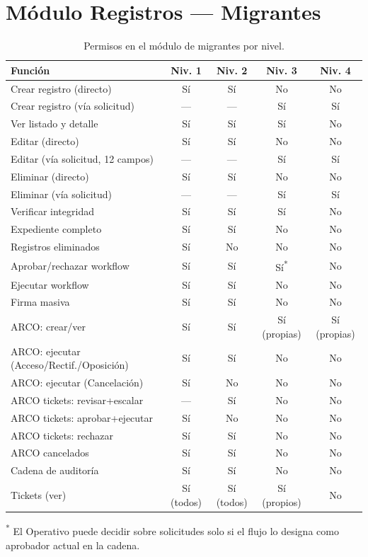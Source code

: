 \documentclass[10pt,letterpaper]{report}
\begin{document}
\section{Módulo Registros — Migrantes}

\begin{table}[H]\centering
\caption{Permisos en el módulo de migrantes por nivel.}
\label{tab:permisos_migrantes}
\begin{tabularx}{\textwidth}{X c c c c}
\toprule
\textbf{Función} & \textbf{Niv. 1} & \textbf{Niv. 2} & \textbf{Niv. 3} & \textbf{Niv. 4}\\
\midrule
Crear registro (directo)               & Sí & Sí & No & No\\
Crear registro (vía solicitud)         & --- & --- & Sí & Sí\\
Ver listado y detalle                  & Sí & Sí & Sí & No\\
Editar (directo)                       & Sí & Sí & No & No\\
Editar (vía solicitud, 12 campos)      & --- & --- & Sí & Sí\\
Eliminar (directo)                     & Sí & Sí & No & No\\
Eliminar (vía solicitud)               & --- & --- & Sí & Sí\\
Verificar integridad                   & Sí & Sí & Sí & No\\
Expediente completo                    & Sí & Sí & No & No\\
Registros eliminados                   & Sí & No & No & No\\
Aprobar/rechazar workflow              & Sí & Sí & Sí\textsuperscript{*} & No\\
Ejecutar workflow                      & Sí & Sí & No & No\\
Firma masiva                           & Sí & Sí & No & No\\
ARCO: crear/ver                        & Sí & Sí & Sí (propias) & Sí (propias)\\
ARCO: ejecutar (Acceso/Rectif./Oposición) & Sí & Sí & No & No\\
ARCO: ejecutar (Cancelación)           & Sí & No & No & No\\
ARCO tickets: revisar+escalar          & --- & Sí & No & No\\
ARCO tickets: aprobar+ejecutar         & Sí & No & No & No\\
ARCO tickets: rechazar                 & Sí & Sí & No & No\\
ARCO cancelados                        & Sí & Sí & No & No\\
Cadena de auditoría                    & Sí & Sí & No & No\\
Tickets (ver)                          & Sí (todos) & Sí (todos) & Sí (propios) & No\\
\bottomrule
\end{tabularx}
\end{table}
{\small \textsuperscript{*} El Operativo puede decidir sobre solicitudes solo si el flujo lo designa como aprobador actual en la cadena.}
\end{document}
